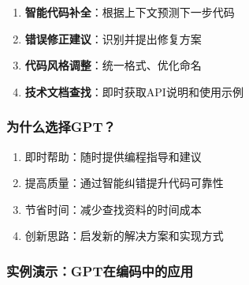 \begin{enumerate}
\def\labelenumi{\arabic{enumi}.}

\item
  \textbf{智能代码补全}：根据上下文预测下一步代码
\item
  \textbf{错误修正建议}：识别并提出修复方案
\item
  \textbf{代码风格调整}：统一格式、优化命名
\item
  \textbf{技术文档查找}：即时获取API说明和使用示例
\end{enumerate}

\hypertarget{ux4e3aux4ec0ux4e48ux9009ux62e9gpt-1}{%
\subsubsection{为什么选择GPT？}\label{ux4e3aux4ec0ux4e48ux9009ux62e9gpt-1}}

\begin{enumerate}
\def\labelenumi{\arabic{enumi}.}

\item
  即时帮助：随时提供编程指导和建议
\item
  提高质量：通过智能纠错提升代码可靠性
\item
  节省时间：减少查找资料的时间成本
\item
  创新思路：启发新的解决方案和实现方式
\end{enumerate}

\hypertarget{ux5b9eux4f8bux6f14ux793agptux5728ux7f16ux7801ux4e2dux7684ux5e94ux7528}{%
\subsubsection{实例演示：GPT在编码中的应用}\label{ux5b9eux4f8bux6f14ux793agptux5728ux7f16ux7801ux4e2dux7684ux5e94ux7528}}

